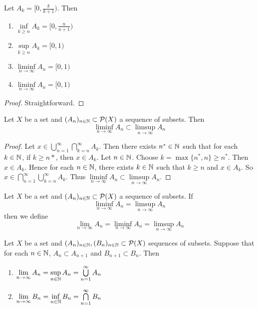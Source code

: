 \documentclass{book}
\begin{document}
	\begin{ex}  
		Let $A_k = [0, \frac{k}{k+1})$. Then 
		\begin{enumerate}
			\item $\inf\limits_{k \geq n}A_k = [0, \frac{n}{n+1})$ \\
			\item $\sup\limits_{k \geq n}A_k = [0,1)$ \\
			\item $\liminf\limits_{n \rightarrow \infty}A_n = [0,1)$ \\
			\item $\liminf\limits_{n \rightarrow \infty}A_n = [0,1)$
		\end{enumerate}
	\end{ex}
	
	\begin{proof}
		Straightforward.
	\end{proof}
	
	\begin{ex}  
		Let $X$ be a set and $(A_n)_{n \in \mathbb{N}} \subset \mathcal{P}(X)$ a sequence of subsets. Then $$\liminf_{n \rightarrow \infty} A_n \subset \limsup_{n \rightarrow \infty} A_n$$
	\end{ex}
	
	\begin{proof}
		Let $x \in \bigcup\limits_{n=1}^{\infty} \bigcap\limits_{k =n}^{\infty} A_k$. Then there exists $n^* \in \mathbb{N}$ such that for each $k \in \mathbb{N}$, if $k \geq n*$, then $x \in A_k$. Let $n \in \mathbb{N}$. Choose $k = \max\{n^*,n\} \geq n^*$. Then $x \in A_k$. Hence for each $n \in \mathbb{N}$, there exists $k \in \mathbb{N}$ such that $k \geq n$ and $x \in A_k$. So $x \in \bigcap\limits_{n=1}^{\infty} \bigcup\limits_{k=n}^{\infty} A_k$. Thus $\liminf\limits_{n \rightarrow \infty}A_n \subset \limsup\limits_{n \rightarrow \infty}A_n$.
	\end{proof}
	
	\begin{defn}  
		Let $X$ be a set and $(A_n)_{n \in \mathbb{N}} \subset \mathcal{P}(X)$ a sequence of subsets. If $$\liminf_{n \rightarrow \infty} A_n = \limsup_{n \rightarrow \infty} A_n$$ then we define $$\lim_{n \rightarrow \infty}A_n = \liminf_{n \rightarrow \infty} A_n = \limsup_{n \rightarrow \infty} A_n$$ 
	\end{defn}
	
	\begin{ex}  
		Let $X$ be a set and $(A_n)_{n \in \mathbb{N}}, (B_n)_{n \in \mathbb{N}} \subset \mathcal{P}(X)$ sequences of subsets. Suppose that for each $n \in \mathbb{N}$, $A_n \subset A_{n+1}$ and $B_{n+1} \subset B_n$. Then 
		\begin{enumerate}
			\item $\lim \limits_{n \rightarrow \infty} A_n = \sup\limits_{n \in \mathbb{N}}A_n = \bigcup\limits_{n=1}^{\infty}A_n$
			\item $\lim \limits_{n \rightarrow \infty} B_n = \inf\limits_{n \in \mathbb{N}}B_n = \bigcap\limits_{n=1}^{\infty}B_n$
		\end{enumerate}
	\end{ex}
	
\end{document}
